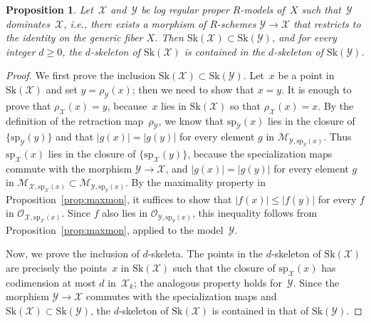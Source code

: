 \documentclass[JEP,XML,SOM,Unicode,NoFloatCountersInSection]{cedram}
\let\mathcal\mathscr
\newtheorem{prop}[equation]{Proposition}
\theoremstyle{definition}
\numberwithin{equation}{subsection}
\newcommand{\cX}{\ensuremath{\mathscr{X}}}
\newcommand{\cY}{\ensuremath{\mathscr{Y}}}
\newcommand{\Sk}{\mathrm{Sk}}
\newcommand{\spe}{\mathrm{sp}}
\begin{document}
\begin{prop}\label{prop:compat1}
Let~$\cX$ and~$\cY$ be log regular proper $R$\nobreakdash-models of~$X$ such that~$\cY$ dominates~$\cX$, {\em i.e.}, there exists a morphism of $R$\nobreakdash-schemes $\cY\to \cX$ that restricts to the identity on the generic fiber $X$. Then $\Sk(\cX)\!\subset\!\Sk(\cY)$, and for every integer $d\!\geq\!0$, the $d$\nobreakdash-skeleton of $\Sk(\cX)$ is contained in the $d$\nobreakdash-skeleton of $\Sk(\cY)$.
\end{prop}
\begin{proof}
We first prove the inclusion $\Sk(\cX)\subset \Sk(\cY)$.
Let~$x$ be a point in $\Sk(\cX)$ and
set $y=\rho_{\cY}(x)$; then we need to show that $x=y$. It is enough to prove that $\rho_{\cX}(x)=y$, because~$x$ lies in $\Sk(\cX)$ so that $\rho_{\cX}(x)=x$.
By the definition of the retraction map~$\rho_{\cY}$, we know that $\spe_{\cY}(x)$ lies in the closure of $\{\spe_{\cY}(y)\}$
and that $|g(x)|=|g(y)|$ for every element $g$ in $\mathcal{M}_{\cY,\spe_{\cY}(x)}$.
Thus $\spe_{\cX}(x)$ lies in the closure of $\{\spe_{\cX}(y)\}$, because the specialization maps commute with the morphism \hbox{$\cY\to \cX$}, and
$|g(x)|=|g(y)|$ for every element $g$ in $\mathcal{M}_{\cX,\spe_{\cX}(x)}\subset \mathcal{M}_{\cY,\spe_{\cY}(x)}$.
By the maximality property in Proposition~\ref{prop:maxmon}, it suffices to show that $|f(x)|\leq |f(y)|$ for every $f$ in $\mathcal{O}_{\cX,\spe_{\cX}(x)}$.
Since $f$ also lies in $\mathcal{O}_{\cY,\spe_{\cY}(x)}$, this inequality follows from Proposition~\ref{prop:maxmon}, applied to the model~$\cY$.

Now, we prove the inclusion of $d$\nobreakdash-skeleta.
The points in the $d$\nobreakdash-skeleton of $\Sk(\cX)$ are precisely the points~$x$ in $\Sk(\cX)$ such that the closure of $\spe_{\cX}(x)$ has codimension at most $d$ in~$\cX_k$; the analogous property holds for~$\cY$.
Since the morphism $\cY\to \cX$ commutes with the specialization maps and $\Sk(\cX)\subset \Sk(\cY)$, the $d$\nobreakdash-skeleton of $\Sk(\cX)$ is contained in that of $\Sk(\cY)$.
\end{proof}
\end{document}
